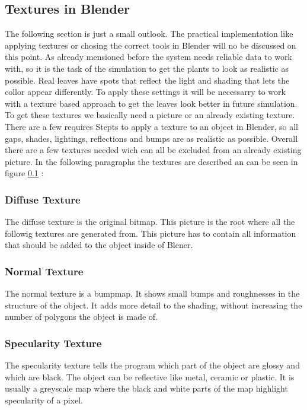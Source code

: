 \subsection{Textures in Blender}
\label{textures}


The following section is just a small outlook. The practical implementation like applying textures or chosing the correct tools in Blender will no be discussed on this point.\newline
As already mensioned before the system needs reliable data to work with, so it is the task of the simulation to get the plants to look as realistic as possible. Real leaves have spots that reflect the light and shading that lets the collor appear differently. To apply these settings it will be necessarry to work with a texture based approach to get the leaves look better in future simulation. 
To get these textures we basically need a picture or an already existing texture. There are a few requires Stepts to apply a texture to an object in Blender, so all gaps, shades, lightings, reflections and bumps are as realistic as possible.
Overall there are a few textures needed wich can all be excluded from an already existing picture.
In the following paragraphs the textures are described an can be seen in figure \ref{textures} :

\subsubsection*{Diffuse Texture}
The diffuse texture is the original bitmap. This picture is the root where all the followig textures are generated from. This picture has to contain all information that should be added to the object inside of Blener.
\subsubsection*{Normal Texture}
The normal texture is a bumpmap. It shows small bumps and roughnesses in the structure of the object. It adds more detail to the shading, without increasing the number of polygons the object is made of. 
\subsubsection*{Specularity Texture}
The specularity texture tells the program which part of the object are glossy and which are black. The object can be reflective like metal, ceramic or plastic. It is usually a greyscale map where the black and white parts of the map highlight specularity of a pixel.
